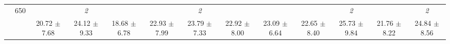 \begin{table}[h]
{\begin{tabular}{
        ccccccccccccc}
 & \multirow{2}{*}{650}& & \textit{ 2 }& & & \textit{ 2 }& & & & \textit{ 2 }& & \textit{ 2 } \\ 
 & & 20.72 $\pm$ 7.68& 24.12 $\pm$ 9.33& 18.68 $\pm$ 6.78& 22.93 $\pm$ 7.99& 23.79 $\pm$ 7.33& 22.92 $\pm$ 8.00& 23.09 $\pm$ 6.64& 22.65 $\pm$ 8.40& 25.73 $\pm$ 9.84& 21.76 $\pm$ 8.22& 24.84 $\pm$ 8.56 \\ \midrule 

        \bottomrule
        \end{tabular}%
        }

        \end{table}
        
